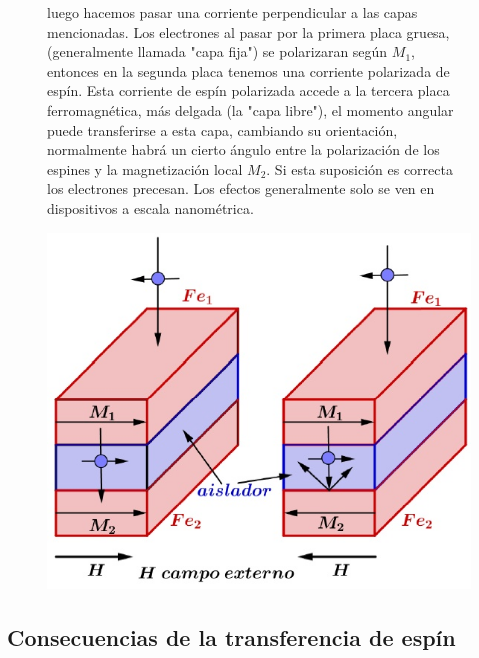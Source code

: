 \begin{figure}[H]
  \begin{minipage}[b]{0.47\textwidth}
luego hacemos pasar una corriente perpendicular a las capas mencionadas. Los electrones al pasar por la primera placa gruesa, (generalmente llamada "capa fija") se polarizaran según $M_{1}$, entonces en la segunda placa tenemos una corriente polarizada de espín. Esta corriente de espín polarizada accede a la tercera placa ferromagnética, más delgada (la "capa libre"), el momento angular puede transferirse a esta capa, cambiando su orientación, normalmente habrá un cierto ángulo entre la polarización de los espines y la magnetización local $M_{2}$. Si esta suposición es correcta los electrones precesan. Los efectos generalmente solo se ven en dispositivos a escala nanométrica.
  \vspace{0cm}
  \end{minipage}
  \hfill
  \begin{minipage}[b]{0.47\textwidth}
     \includegraphics[width=1.0\textwidth]{./Figures/fig349}
	\label{fig:349}
	  \vspace{1.5cm}
  \end{minipage}
\end{figure}


\subsection{Consecuencias de la transferencia de espín}


